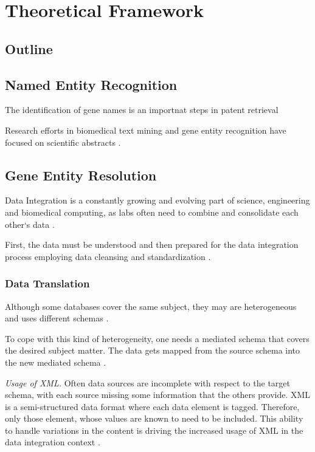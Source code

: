 \chapter{Theoretical Framework}
\label{cha:theory}

\section{Outline}

\section{Named Entity Recognition}

The identification of gene names is an importnat steps in patent retrieval

Research efforts in biomedical text mining and gene entity recognition have focused on scientific abstracts \cite{RodriguezEsteban2016TextMP}.

\section{Gene Entity Resolution}

Data Integration is a constantly growing and evolving part of science, engineering and biomedical computing, as labs often need to combine and consolidate each other`s data \cite{Bernstein2008InformationII}.

First, the data must be understood and then prepared for the data integration process employing data cleansing and standardization \cite{Bernstein2008InformationII}.



\subsection{Data Translation}

Although some databases cover the same subject, they may are heterogeneous and uses different schemas \cite{Bernstein2008InformationII}.

To cope with this kind of heterogeneity, one needs a mediated schema that covers the desired subject matter. The data gets mapped from the source schema into the new mediated schema \cite{Bernstein2008InformationII}.

\textit{Usage of XML.} Often data sources are incomplete with respect to the target schema, with each source missing some information that the others provide. XML is a semi-structured data format where each data element is tagged. Therefore, only those element, whose values are known to need to be included. This ability to handle variations in the content is driving the increased usage of XML in the data integration context \cite{Bernstein2008InformationII}.

